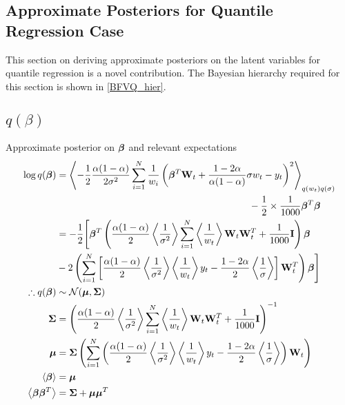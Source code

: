 \clearpage
\begin{appendices}


\section{Approximate Posteriors for Quantile Regression Case}
This section on deriving approximate posteriors on the latent variables for quantile regression is a novel contribution. The Bayesian hierarchy required for this section is shown in \eqref{BFVQ_hier}.

\subsection{ $q(\beta)$}
\label{sec:q_beta}
Approximate posterior on $\bm{\beta}$ and relevant expectations
\begin{align}
\nonumber
\log q(\bm{\beta})&=\left\langle-\frac{1}{2}\frac{\alpha(1-\alpha)}{2\sigma^2}\sum_{i=1}^{N}\frac{1}{w_i}\left(\bm{\beta}^T \mathbf{W}_t+\frac{1-2\alpha}{\alpha(1-\alpha)}\sigma w_t-y_t\right)^2\right\rangle_{q(w_t)q(\sigma)}\\
\nonumber
&\qquad\qquad\qquad\qquad\qquad\qquad\qquad\qquad\qquad\qquad-\frac{1}{2}\times\frac{1}{1000}\bm{\beta}^T\bm{\beta}\\
\nonumber
&=-\frac{1}{2}\Biggl[\bm{\beta}^T\left(\frac{\alpha(1-\alpha)}{2}\left\langle\frac{1}{\sigma^2}\right\rangle\sum_{i=1}^{N}\left\langle\frac{1}{w_t}\right\rangle\mathbf{W}_t\mathbf{W}_t^T+\frac{1}{1000}\mathbf{I}\right)\bm{\beta}\\
\nonumber
&-2\left(\sum_{i=1}^{N}\left[\frac{\alpha(1-\alpha)}{2}\left\langle\frac{1}{\sigma^2}\right\rangle\left\langle\frac{1}{w_t}\right\rangle y_t-\frac{1-2\alpha}{2}\left\langle\frac{1}{\sigma}\right\rangle\right]\mathbf{W}_t^T\right)\bm{\beta}\Biggr]\\
\therefore q(\bm{\beta})&\sim{\mathcal{N}}({\boldsymbol{\mu}},{\mathbf{\Sigma}})\\
{\mathbf{\Sigma}} &=\left(\frac{\alpha(1-\alpha)}{2}\left\langle\frac{1}{\sigma^2}\right\rangle\sum_{i=1}^{N}\left\langle\frac{1}{w_t}\right\rangle\mathbf{W}_t\mathbf{W}_t^T+\frac{1}{1000}\mathbf{I}\right)^{-1}\\
{\boldsymbol{\mu}}&={\mathbf{\Sigma}}\left(\sum_{i=1}^{N}\left(\frac{\alpha(1-\alpha)}{2}\left\langle\frac{1}{\sigma^2}\right\rangle\left\langle\frac{1}{w_t}\right\rangle y_t-\frac{1-2\alpha}{2}\left\langle\frac{1}{\sigma}\right\rangle\right)\mathbf{W}_t\right)\\
\left\langle\bm{\beta}\right\rangle&={\boldsymbol{\mu}}\\
\left\langle\bm{\beta}\bm{\beta}^T\right\rangle&={\mathbf{\Sigma}}+{\boldsymbol{\mu}}{\boldsymbol{\mu}}^T
\end{align}


\end{appendices}
